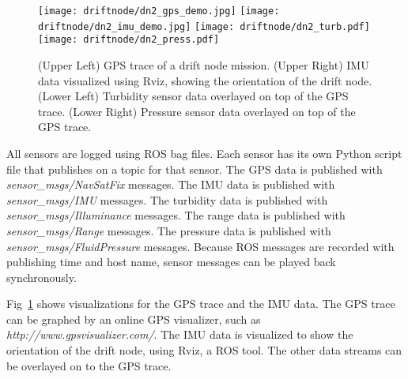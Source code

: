 \begin{figure}[h]
	\begin{center}
	\texttt{[image: driftnode/dn2\_gps\_demo.jpg]}
	\texttt{[image: driftnode/dn2\_imu\_demo.jpg]}
	\texttt{[image: driftnode/dn2\_turb.pdf]}
	\texttt{[image: driftnode/dn2\_press.pdf]}
	\caption[Driftnode]{
		(Upper Left) GPS trace of a drift node mission.
		(Upper Right) IMU data visualized using Rviz, showing the orientation of the drift node.
		(Lower Left) Turbidity sensor data overlayed on top of the GPS trace.
		(Lower Right) Pressure sensor data overlayed on top of the GPS trace.
	} \label{fig:driftvis}
	\end{center}
	\vspace{-1em}
\end{figure}

All sensors are logged using ROS bag files.
Each sensor has its own Python script file that publishes on a topic for that sensor.
The GPS data is published with \textit{sensor\_msgs/NavSatFix} messages.
The IMU data is published with \textit{sensor\_msgs/IMU} messages.
The turbidity data is published with \textit{sensor\_msgs/Illuminance} messages.
The range data is published with \textit{sensor\_msgs/Range} messages.
The pressure data is published with \textit{sensor\_msgs/FluidPressure} messages.
Because ROS messages are recorded with publishing time and host name, sensor messages can be played back synchronously.


Fig~\ref{fig:driftvis} shows visualizations for the GPS trace and the IMU data.
The GPS trace can be graphed by an online GPS visualizer, such as \emph{http://www.gpsvisualizer.com/}.
The IMU data is visualized to show the orientation of the drift node, using Rviz, a ROS tool.
The other data streams can be overlayed on to the GPS trace.
